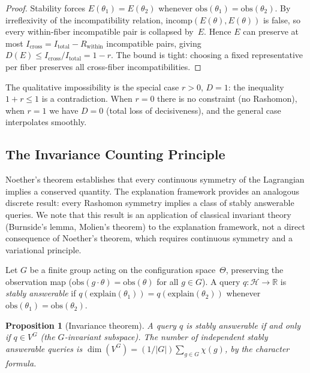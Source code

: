 \documentclass[11pt,a4paper]{article}
\newtheorem{proposition}[theorem]{Proposition}
\newcommand{\R}{\mathbb{R}}
\begin{document}
\begin{proof}
Stability forces $E(\theta_1) = E(\theta_2)$ whenever
$\mathrm{obs}(\theta_1) = \mathrm{obs}(\theta_2)$.  By irreflexivity of the
incompatibility relation, $\mathrm{incomp}(E(\theta), E(\theta))$ is false,
so every within-fiber incompatible pair is collapsed by~$E$.  Hence $E$ can
preserve at most $I_{\text{cross}} = I_{\text{total}} - R_{\text{within}}$
incompatible pairs, giving $D(E) \leq I_{\text{cross}} / I_{\text{total}} =
1 - r$.  The bound is tight: choosing a fixed representative per fiber
preserves all cross-fiber incompatibilities.
\end{proof}

The qualitative impossibility is the special case $r > 0$, $D = 1$: the
inequality $1 + r \leq 1$ is a contradiction.  When $r = 0$ there is no
constraint (no Rashomon), when $r = 1$ we have $D = 0$ (total loss of
decisiveness), and the general case interpolates smoothly.

\subsection{The Invariance Counting Principle}
\label{sec:bridge-noether}

Noether's theorem \citep{noether1918invariante} establishes that every
continuous symmetry of the Lagrangian implies a conserved quantity.  The
explanation framework provides an analogous discrete result: every Rashomon
symmetry implies a class of stably answerable queries.  We note that this
result is an application of classical invariant theory (Burnside's lemma,
Molien's theorem) to the explanation framework, not a direct consequence of
Noether's theorem, which requires continuous symmetry and a variational
principle.

Let $G$ be a finite group acting on the configuration space~$\Theta$,
preserving the observation map ($\mathrm{obs}(g \cdot \theta) =
\mathrm{obs}(\theta)$ for all $g \in G$).  A query
$q\colon \mathcal{H} \to \R$ is \emph{stably answerable} if
$q(\mathrm{explain}(\theta_1)) = q(\mathrm{explain}(\theta_2))$ whenever
$\mathrm{obs}(\theta_1) = \mathrm{obs}(\theta_2)$.

\begin{proposition}[Invariance theorem]
\label{prop:noether}
A query $q$ is stably answerable if and only if $q \in V^G$ (the
$G$-invariant subspace).  The number of independent stably answerable queries
is $\dim(V^G) = (1/|G|) \sum_{g \in G} \chi(g)$, by the character formula.
\end{proposition}
\end{document}
